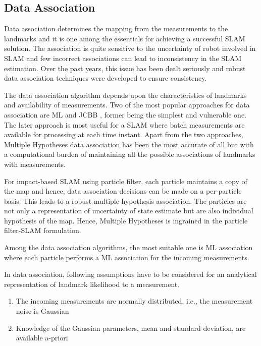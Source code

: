\subsection{Data Association} \label{sec::da}
Data association determines the mapping from the measurements to the landmarks and it is one among the essentials for achieving a successful SLAM solution. The association is quite sensitive to the uncertainty of robot involved in SLAM and few incorrect associations can lead to inconsistency in the SLAM estimation. Over the past years, this issue has been dealt seriously and robust data association techniques were developed to ensure consistency.

The data association algorithm depends upon the characteristics of landmarks and availability of measurements. Two of the most popular approaches for data association are \acf{ML} and \acf{JCBB} \cite{bailey2006simultaneous}, former being the simplest and vulnerable one.  The later approach is most useful for a SLAM where batch measurements are available for processing at each time instant. Apart from the two approaches, Multiple Hypotheses data association \cite{jensfelt2001active} has been the most accurate of all but with a computational burden of maintaining all the possible associations of landmarks with measurements.  

For impact-based SLAM using particle filter, each particle maintains a copy of the map and hence, data association decisions can be made on a per-particle basis. This leads to a robust multiple hypothesis association. The particles are not only a representation of uncertainty of state estimate but are also individual hypothesis of the map. Hence, Multiple Hypotheses is ingrained in the particle filter-SLAM formulation.

Among the data association algorithms, the most suitable one is \acf{ML} association where each particle performs a ML association for the incoming measurements. 

\begin{rem}
In data association, following assumptions have to be considered for an analytical representation of landmark likelihood to a measurement.
\begin{enumerate}
\item The incoming measurements are normally distributed, i.e., the measurement noise is Gaussian
\item Knowledge of the Gaussian parameters, mean and standard deviation, are available a-priori 
\end{enumerate}
\end{rem}

